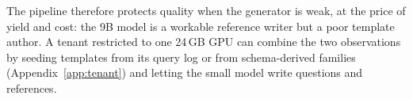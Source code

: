 The pipeline therefore protects quality when the generator is weak, at the price of yield and cost: the 9B model is a workable reference writer but a poor template author. A tenant restricted to one 24\,GB GPU can combine the two observations by seeding templates from its query log or from schema-derived families (Appendix~\ref{app:tenant}) and letting the small model write questions and references.
